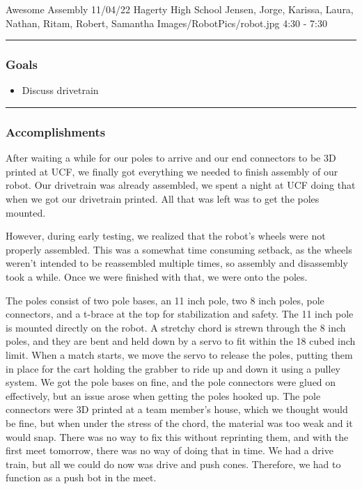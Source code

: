 \insertmeeting 
	{Awesome Assembly} 
	{11/04/22}
	{Hagerty High School}
	{Jensen, Jorge, Karissa, Laura, Nathan, Ritam, Robert, Samantha}
	{Images/RobotPics/robot.jpg}
	{4:30 - 7:30}
	
\noindent\hfil\rule{\textwidth}{.4pt}\hfil
\subsubsection*{Goals}
\begin{itemize}
    \item Discuss drivetrain

\end{itemize} 

\noindent\hfil\rule{\textwidth}{.4pt}\hfil

\subsubsection*{Accomplishments}
After waiting a while for our poles to arrive and our end connectors to be 3D printed at UCF, we finally got everything we needed to finish assembly of our robot. Our drivetrain was already assembled, we spent a night at UCF doing that when we got our drivetrain printed. All that was left was to get the poles mounted.

However, during early testing, we realized that the robot's wheels were not properly assembled. This was a somewhat time consuming setback, as the wheels weren't intended to be reassembled multiple times, so assembly and disassembly took a while. Once we were finished with that, we were onto the poles.

The poles consist of two pole bases, an 11 inch pole, two 8 inch poles, pole connectors, and a t-brace at the top for stabilization and safety. The 11 inch pole is mounted directly on the robot. A stretchy chord is strewn through the 8 inch poles, and they are bent and held down by a servo to fit within the 18 cubed inch limit. When a match starts, we move the servo to release the poles, putting them in place for the cart holding the grabber to ride up and down it using a pulley system.
We got the pole bases on fine, and the pole connectors were glued on effectively, but an issue arose when getting the poles hooked up. The pole connectors were 3D printed at a team member's house, which we thought would be fine, but when under the stress of the chord, the material was too weak and it would snap. There was no way to fix this without reprinting them, and with the first meet tomorrow, there was no way of doing that in time. We had a drive train, but all we could do now was drive and push cones. Therefore, we had to function as a push bot in the meet.


